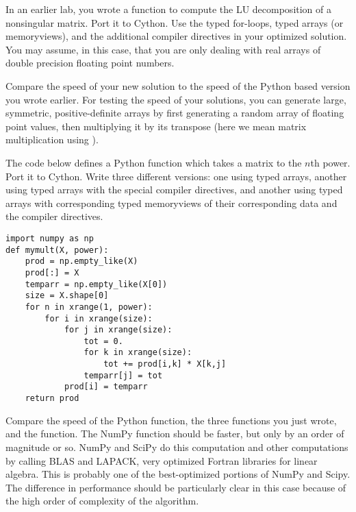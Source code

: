 \begin{problem}
In an earlier lab, you wrote a function to compute the LU decomposition of a nonsingular matrix.
Port it to Cython.
Use the typed for-loops, typed arrays (or memoryviews), and the additional compiler directives in your optimized solution.
You may assume, in this case, that you are only dealing with real arrays of double precision floating point numbers.

Compare the speed of your new solution to the speed of the Python based version you wrote earlier.
For testing the speed of your solutions, you can generate large, symmetric, positive-definite arrays by first generating a random array of floating point values, then multiplying it by its transpose (here we mean matrix multiplication using ).
\end{problem}

\begin{problem}
The code below defines a Python function which takes a matrix to the $n$th power.
Port it to Cython.
Write three different versions: one using typed arrays, another using typed arrays with the special compiler directives, and another using typed arrays with corresponding typed memoryviews of their corresponding data and the compiler directives.
\begin{lstlisting}
import numpy as np
def mymult(X, power):
    prod = np.empty_like(X)
    prod[:] = X
    temparr = np.empty_like(X[0])
    size = X.shape[0]
    for n in xrange(1, power):
        for i in xrange(size):
            for j in xrange(size):
                tot = 0.
                for k in xrange(size):
                    tot += prod[i,k] * X[k,j]
                temparr[j] = tot
            prod[i] = temparr
    return prod
\end{lstlisting}

Compare the speed of the Python function, the three functions you just wrote, and the  function.
The NumPy function should be faster, but only by an order of magnitude or so.
NumPy and SciPy do this computation and other computations by calling BLAS and LAPACK, very optimized Fortran libraries for linear algebra.
This is probably one of the best-optimized portions of NumPy and Scipy.
The difference in performance should be particularly clear in this case because of the high order of complexity of the algorithm.
\end{problem}

